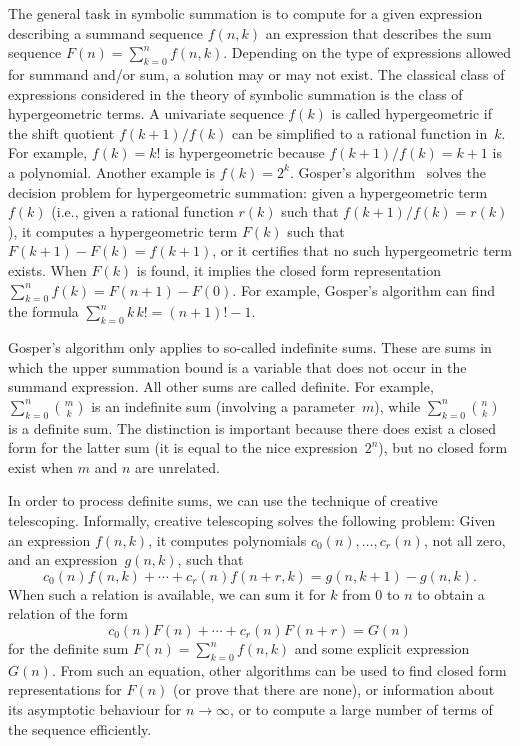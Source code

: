 \documentclass{jssc}
\begin{document}
 The general task in symbolic summation is to compute for a given expression describing
 a summand sequence $f(n,k)$ an expression that describes the sum sequence $F(n)=\sum_{k=0}^n f(n,k)$.
 Depending on the type of expressions allowed for summand and/or sum, a solution may or may
 not exist. The classical class of expressions considered in the theory of symbolic summation
 is the class of hypergeometric terms. A univariate sequence $f(k)$ is called hypergeometric if the
 shift quotient $f(k+1)/f(k)$ can be simplified to a rational function in~$k$. For example,
 $f(k)=k!$ is hypergeometric because $f(k+1)/f(k)=k+1$ is a polynomial.
 Another example is $f(k)=2^k$.
 Gosper's algorithm~\cite{gosper78} solves the decision problem for hypergeometric summation:
 given a hypergeometric term $f(k)$ (i.e., given a rational function $r(k)$ such that
 $f(k+1)/f(k)=r(k)$), it computes a hypergeometric term $F(k)$ such that $F(k+1)-F(k)=f(k+1)$,
 or it certifies that no such hypergeometric term exists.
 When $F(k)$ is found, it implies the closed form representation $\sum_{k=0}^n f(k)=F(n+1)-F(0)$.
 For example, Gosper's algorithm can find the formula $\sum_{k=0}^n k\,k!=(n+1)!-1$.

 Gosper's algorithm only applies to so-called indefinite sums. These are sums in which the upper
 summation bound is a variable that does not occur in the summand expression. All other sums
 are called definite. For example,
 $\sum_{k=0}^n \binom mk$ is an indefinite sum (involving a parameter~$m$), while
 $\sum_{k=0}^n \binom nk$ is a definite sum.
 The distinction is important because there does exist a closed form for the latter sum
 (it is equal to the nice expression~$2^n$), but no closed form exist when $m$ and $n$ are
 unrelated.

 In order to process definite sums, we can use the technique of creative telescoping.
 Informally, creative telescoping solves the following problem:
 Given an expression $f(n,k)$, it computes polynomials $c_0(n),\dots,c_r(n)$, not all zero,
 and an expression~$g(n,k)$, such that
 \[
   c_0(n)f(n,k) + \cdots + c_r(n)f(n+r,k) = g(n,k+1) - g(n,k).
 \]
 When such a relation is available, we can sum it for $k$ from $0$ to $n$ to obtain a relation of the form
 \[
   c_0(n) F(n) + \cdots + c_r(n) F(n+r) = G(n)
 \]
 for the definite sum $F(n)=\sum_{k=0}^n f(n,k)$ and some explicit expression~$G(n)$.
 From such an equation, other algorithms can be used to find closed form representations for $F(n)$ (or
 prove that there are none), or information about its asymptotic behaviour for $n\to\infty$, or
 to compute a large number of terms of the sequence efficiently.
\end{document}
